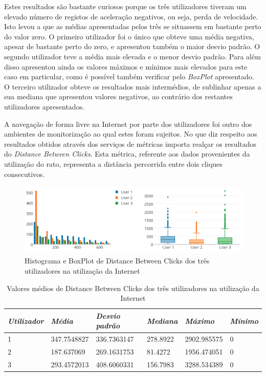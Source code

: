 Estes resultados são bastante curiosos porque os três utilizadores tiveram um elevado número de registos de aceleração negativos, ou seja, perda de velocidade. Isto levou a que as médias apresentadas pelos três se situassem em bastante perto do valor zero. O primeiro utilizador foi o único que obteve uma média negativa, apesar de bastante perto do zero, e apresentou também o maior desvio padrão. O segundo utilizador teve a média mais elevada e o menor desvio padrão. Para além disso apresentou ainda os valores máximos e mínimos mais elevados para este caso em particular, como é possível também verificar pelo \textit{BoxPlot} apresentado. O terceiro utilizador obteve os resultados mais intermédios, de sublinhar apenas a sua mediana que apresentou valores negativos, ao contrário dos restantes utilizadores apresentados.





A navegação de forma livre na Internet por parte dos utilizadores foi outro dos ambientes de monitorização ao qual estes foram sujeitos. No que diz respeito aos resultados obtidos através dos serviços de métricas importa realçar os resultados do \textit{Distance Between Clicks}. Esta métrica, referente aos dados provenientes da utilização do rato, representa a distância percorrida entre dois cliques consecutivos. 


\begin{figure}[htb]
   \centering
   \includegraphics[scale=0.45]{Images/distancebetweenclicksnet.png}
   \caption{Histograma e BoxPlot de Distance Between Clicks dos três utilizadores na utilização da Internet}
\end{figure}

{\renewcommand{\arraystretch}{1.0}
\begin{table}[!htb]
\centering
\label{tab:a_tbk}
\vspace{2pt}
\begin{tabular}{ | l | l | l | l | l | l |  }
\hline
\textit{Utilizador}&\textit{Média}&\textit{Desvio padrão}&\textit{Mediana} & \textit{Máximo} & \textit{Mínimo}\\  
\hline
1&347.7548827&336.7363147&278.8922&2902.985575&0 \\
2&187.637069&269.1631753&81.4272&1956.474051&0 \\
3&293.4572013&408.6060331&156.7983&3288.534389&0 \\
\hline
\end{tabular}
\caption{Valores médios de Distance Between Clicks dos três utilizadores na utilização da Internet} 
\end{table}}


